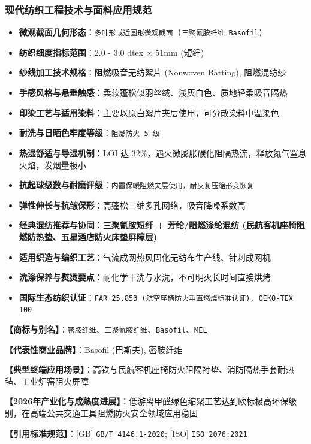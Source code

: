 \documentclass[11pt,openright,twoside,UTF8]{ctexbook}
\begin{document}
\subsubsection*{现代纺织工程技术与面料应用规范}
\begin{itemize} \setlength{\itemsep}{2pt}
    \item \textbf{微观截面几何形态}：\texttt{多叶形或近圆形微观截面 (三聚氰胺纤维 Basofil)}
    \item \textbf{纺织细度指标范围}：2.0 - 3.0 dtex $\times$ 51mm (短纤)
    \item \textbf{纱线加工技术规格}：阻燃吸音无纺絮片 (Nonwoven Batting), 阻燃混纺纱
    \item \textbf{手感风格与悬垂触感}：柔软蓬松似羽丝绒、浅灰白色、质地轻柔吸音隔热
    \item \textbf{印染工艺与适用染料}：主要以原白絮片夹层使用，可分散染料中温染色
    \item \textbf{耐洗与日晒色牢度等级}：\texttt{阻燃防火 5 级}
    \item \textbf{热湿舒适与导湿机制}：LOI 达 32\%，遇火微膨胀碳化阻隔热流，释放氮气窒息火焰，发烟量极小
    \item \textbf{抗起球级数与耐磨评级}：\texttt{内置保暖阻燃夹层使用，耐反复压缩形变恢复}
    \item \textbf{弹性伸长与抗皱保形}：高蓬松三维多孔网络，吸音降噪系数高
    \item \textbf{经典混纺推荐与协同}：\textbf{三聚氰胺短纤 + 芳纶/阻燃涤纶混纺 (民航客机座椅阻燃防热垫、五星酒店防火床垫屏障层)}
    \item \textbf{适用织造与编织工艺}：气流成网热风固化无纺布生产线、针刺成网机
    \item \textbf{洗涤保养与熨烫要点}：耐化学干洗与水洗，不可明火长时间直接烘烤
    \item \textbf{国际生态纺织认证}：\texttt{FAR 25.853 (航空座椅防火垂直燃烧标准认证), OEKO-TEX 100}
\end{itemize}
\vspace{0.2cm}

\noindent\textbf{【商标与别名】}：\texttt{密胺纤维}、\texttt{三聚氰胺纤维}、\texttt{Basofil}、\texttt{MEL}\par
\noindent\textbf{【代表性商业品牌】}：Basofil (巴斯夫), 密胺纤维\par
\noindent\textbf{【典型终端应用场景】}：高铁与民航客机座椅防火阻隔衬垫、消防隔热手套耐热毡、工业炉窑阻火屏障\par
\noindent\textbf{【2026年产业化与成熟度进展】}：低游离甲醛绿色缩聚工艺达到欧标极高环保级别，在高端公共交通工具阻燃防火安全领域应用稳固\par
\noindent\textbf{【引用标准规范】}：[GB] \texttt{GB/T 4146.1-2020}; [ISO] \texttt{ISO 2076:2021}\par
\vspace{0.5cm}
\end{document}
